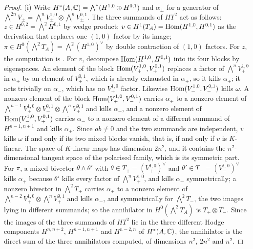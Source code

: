 \begin{proof}
(i) Write $H^{*}(A,\mathbb{C})=\bigwedge^{*}(H^{1,0}\oplus H^{0,1})$ and
$\alpha_{\pm}$ for a generator of $\bigwedge^{2n}V_{\pm}
=\bigwedge^{n}V_{\pm}^{1,0}\otimes\bigwedge^{n}V_{\pm}^{0,1}$. The three
summands of $HT^{2}$ act as follows: $z\in H^{0,2}=\bigwedge^{2}H^{0,1}$ by
wedge product; $v\in H^{1}(T_{A})=\operatorname{Hom}(H^{1,0},H^{0,1})$ as the derivation
that replaces one $(1,0)$ factor by its image; $\pi\in H^{0}(\bigwedge^{2}T_{A})
=\bigwedge^{2}(H^{1,0})^{\vee}$ by double contraction of $(1,0)$ factors. For
$z$, the computation is . For $v$, decompose
$\operatorname{Hom}(H^{1,0},H^{0,1})$ into its four blocks by eigenspaces. An element of
the block $\operatorname{Hom}(V_{+}^{1,0},V_{+}^{0,1})$ replaces a factor of
$\bigwedge^{n}V_{+}^{1,0}$ in $\alpha_{+}$ by an element of $V_{+}^{0,1}$,
which is already exhausted in $\alpha_{+}$, so it kills $\alpha_{+}$; it acts
trivially on $\alpha_{-}$,
which has no $V_{+}^{1,0}$ factor. Likewise $\operatorname{Hom}(V_{-}^{1,0},V_{-}^{0,1})$
kills $\omega$. A nonzero element of the block $\operatorname{Hom}(V_{+}^{1,0},V_{-}^{0,1})$
carries $\alpha_{+}$ to a nonzero element of
$\bigwedge^{n-1}V_{+}^{1,0}\otimes V_{-}^{0,1}\otimes\bigwedge^{n}V_{+}^{0,1}$
and kills $\alpha_{-}$, and a nonzero element of $\operatorname{Hom}(V_{-}^{1,0},V_{+}^{0,1})$
carries $\alpha_{-}$ to a nonzero element of a different summand of
$H^{n-1,n+1}$ and kills $\alpha_{+}$. Since $ab\ne0$ and the two summands are
independent, $v$ kills $\omega$ if and only if its two mixed blocks vanish,
that is, if and only if $v$ is $K$-linear. The space of $K$-linear maps has
dimension $2n^{2}$, and it contains the $n^{2}$-dimensional tangent space of
the polarised family, which is its symmetric part. For $\pi$, a mixed
bivector $\theta\wedge\theta'$ with $\theta\in T_{+}=(V_{+}^{1,0})^{\vee}$ and
$\theta'\in T_{-}=(V_{-}^{1,0})^{\vee}$ kills $\alpha_{+}$ because $\theta'$
kills every factor of $\bigwedge^{n}V_{+}^{1,0}$, and kills $\alpha_{-}$
symmetrically; a nonzero bivector in $\bigwedge^{2}T_{+}$ carries $\alpha_{+}$
to a nonzero element of $\bigwedge^{n-2}V_{+}^{1,0}\otimes\bigwedge^{n}V_{+}^{0,1}$
and kills $\alpha_{-}$, and symmetrically for $\bigwedge^{2}T_{-}$, the two
images lying in different summands; so the annihilator in
$H^{0}(\bigwedge^{2}T_{A})$ is $T_{+}\otimes T_{-}$. Since the images of the
three summands of $HT^{2}$ lie in the three different Hodge components
$H^{n,n+2}$, $H^{n-1,n+1}$ and $H^{n-2,n}$ of $H^{*}(A,\mathbb{C})$, the annihilator
is the direct sum of the three annihilators computed, of dimensions $n^{2}$,
$2n^{2}$ and $n^{2}$.


\end{proof}
